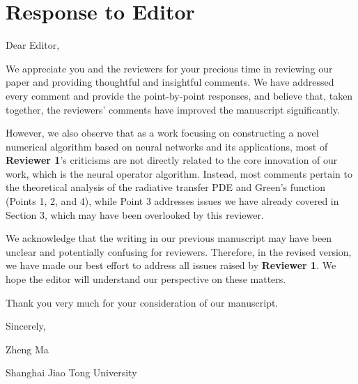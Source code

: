 \documentclass[12pt]{article}
\newcounter{reviewer}
\newcounter{point}[reviewer]
\begin{document}
\section*{Response to Editor}

\begin{flushleft}
  Dear Editor,
\end{flushleft}

We appreciate you and the reviewers for your precious time in reviewing our paper and providing thoughtful and insightful comments.
We have addressed every comment and provide the point-by-point responses, and believe that, taken together, the reviewers' comments have improved the manuscript significantly.

However, we also observe that as a work focusing on constructing a novel numerical algorithm based on neural networks and its applications, most of \textbf{Reviewer 1}'s criticisms are not directly related to the core innovation of our work, which is the neural operator algorithm. Instead, most comments pertain to the theoretical analysis of the radiative transfer PDE and Green's function (Points 1, 2, and 4), while Point 3 addresses issues we have already covered in Section 3, which may have been overlooked by this reviewer.

We acknowledge that the writing in our previous manuscript may have been unclear and potentially confusing for reviewers. Therefore, in the revised version, we have made our best effort to address all issues raised by \textbf{Reviewer 1}.
We hope the editor will understand our perspective on these matters.

Thank you very much for your consideration of our manuscript.

\begin{flushleft}
  Sincerely,

  Zheng Ma

  Shanghai Jiao Tong University
\end{flushleft}
\end{document}

